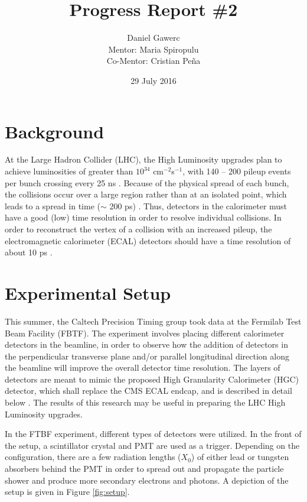 \documentclass[12pt]{article}
\begin{document}
\author{Daniel Gawerc\\Mentor: Maria Spiropulu\\Co-Mentor: Cristian Peña}
\title{Progress Report \#2}
\date{29 July 2016}
\maketitle

\section{Background}
At the Large Hadron Collider (LHC), the High Luminosity upgrades plan to achieve luminosities of greater than $10^{34}$ cm$^{-2}$s$^{-1}$, with 140 – 200 pileup events per bunch crossing every 25 ns \cite{P1}. Because of the physical spread of each bunch, the collisions occur over a large region rather than at an isolated point, which leads to a spread in time ($\sim$ 200 ps) \cite{P1}. Thus, detectors in the calorimeter must have a good (low) time resolution in order to resolve individual collisions. In order to reconstruct the vertex of a collision with an increased pileup, the electromagnetic calorimeter (ECAL) detectors should have a time resolution of about 10 ps \cite{P1}.


\section{Experimental Setup}
This summer, the Caltech Precision Timing group took data at the Fermilab Test Beam Facility (FBTF). The experiment involves placing different calorimeter detectors in the beamline, in order to observe how the addition of detectors in the perpendicular transverse plane and/or parallel longitudinal direction along the beamline will improve the overall detector time resolution. The layers of detectors are meant to mimic the proposed High Granularity Calorimeter (HGC) detector, which shall replace the CMS ECAL endcap, and is described in detail below \cite{P2}. The results of this research may be useful in preparing the LHC High Luminosity upgrades.

In the FTBF experiment, different types of detectors were utilized. In the front of the setup, a scintillator crystal and PMT are used as a trigger. Depending on the configuration, there are a few radiation lengths ($X_0$) of either lead or tungsten absorbers behind the PMT in order to spread out and propagate the particle shower and produce more secondary electrons and photons. A depiction of the setup is given in Figure \ref{fig:setup}.
\end{document}
